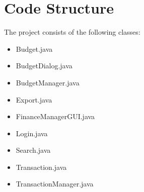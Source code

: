 \section{Code Structure}

The project consists of the following classes:

\begin{itemize}
\item Budget.java
\item BudgetDialog.java
\item BudgetManager.java
\item Export.java 
\item FinanceManagerGUI.java
\item Login.java
\item Search.java
\item Transaction.java
\item TransactionManager.java

\end{itemize}
